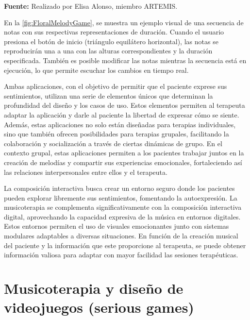 \begin{center}
	\textbf{Fuente:} Realizado por Elisa Alonso, miembro ARTEMIS.
\end{center}

En la \autoref{fig:FloralMelodyGame}, se muestra un ejemplo visual de una secuencia de notas con sus respectivas representaciones de duración. Cuando el usuario presiona el botón de inicio (triángulo equilátero horizontal), las notas se reproducirán una a una con las alturas correspondientes y la duración especificada. También es posible modificar las notas mientras la secuencia está en ejecución, lo que permite escuchar los cambios en tiempo real.

Ambas aplicaciones, con el objetivo de permitir que el paciente exprese sus sentimientos, utilizan una serie de elementos únicos que determinan la profundidad del diseño y los casos de uso. Estos elementos permiten al terapeuta adaptar la aplicación y darle al paciente la libertad de expresar cómo se siente. Además, estas aplicaciones no solo están diseñadas para terapias individuales, sino que también ofrecen posibilidades para terapias grupales, facilitando la colaboración y socialización a través de ciertas dinámicas de grupo. En el contexto grupal, estas aplicaciones permiten a los pacientes trabajar juntos en la creación de melodías y compartir sus experiencias emocionales, fortaleciendo así las relaciones interpersonales entre ellos y el terapeuta.

La composición interactiva busca crear un entorno seguro donde los pacientes pueden explorar libremente sus sentimientos, fomentando la autoexpresión. La musicoterapia se complementa significativamente con la composición interactiva digital, aprovechando la capacidad expresiva de la música en entornos digitales. Estos entornos permiten el uso de visuales emocionantes junto con sistemas modulares adaptables a diversas situaciones. En función de la creación musical del paciente y la información que este proporcione al terapeuta, se puede obtener información valiosa para adaptar con mayor facilidad las sesiones terapéuticas.

\section{Musicoterapia y diseño de videojuegos (serious games)}

